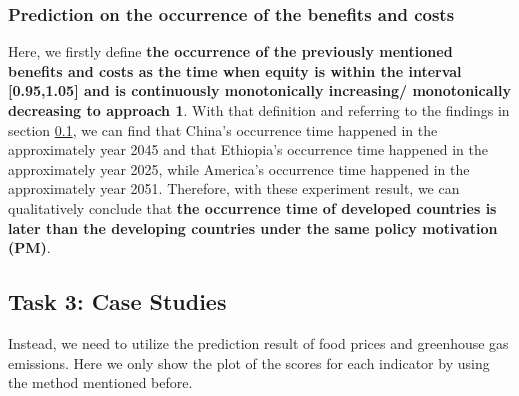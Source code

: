 \documentclass[12pt]{article}
\begin{document}
\subsubsection{Prediction on the occurrence of the benefits and costs}
Here, we firstly define \textbf{the occurrence of the previously mentioned benefits and costs as the time when equity is within the interval [0.95,1.05] and is continuously monotonically increasing/ monotonically decreasing to approach 1}. With that definition and referring to the findings in section \ref{sec:case}, we can find that China's occurrence time happened in the approximately year 2045 and that Ethiopia's occurrence time happened in the approximately year 2025, while America's occurrence time happened in the approximately year 2051. Therefore, with these experiment result, we can qualitatively conclude that \textbf{the occurrence time of developed countries is later than the developing countries under the same policy motivation (PM)}.

\subsection{Task 3: Case Studies}\label{sec:case}

Instead, we need to utilize the prediction result of food prices and greenhouse gas emissions. Here we only show the plot of the scores for each indicator by using the method mentioned before. 
\end{document}
